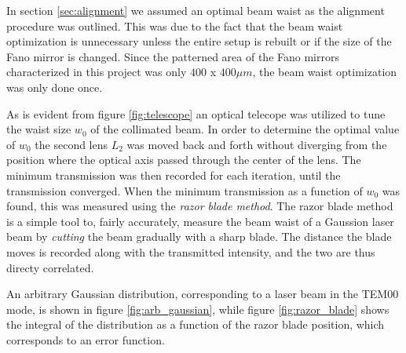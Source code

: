 In section \ref{sec:alignment} we assumed an optimal beam waist as the alignment procedure was outlined. This was due to the fact that the beam waist optimization is unnecessary unless the entire setup is rebuilt or if the size of the Fano mirror is changed. Since the patterned area of the Fano mirrors characterized in this project was only $400$ x $400 \mu m$, the beam waist optimization was only done once.

As is evident from figure \ref{fig:telescope} an optical telecope was utilized to tune the waist size $w_0$ of the collimated beam. In order to determine the optimal value of $w_0$ the second lens $L_2$ was moved back and forth without diverging from the position where the optical axis passed through the center of the lens. The minimum transmission was then recorded for each iteration, until the transmission converged. When the minimum transmission as a function of $w_0$ was found, this was measured using the \emph{razor blade method}. The razor blade method is a simple tool to, fairly accurately, measure the beam waist of a Gaussion laser beam by \emph{cutting} the beam gradually with a sharp blade. The distance the blade moves is recorded along with the transmitted intensity, and the two are thus directy correlated\cite{Forster}.

An arbitrary Gaussian distribution, corresponding to a laser beam in the TEM00 mode, is shown in figure \ref{fig:arb_gaussian}, while figure \ref{fig:razor_blade} shows the integral of the distribution as a function of the razor blade position, which corresponds to an error function. 

